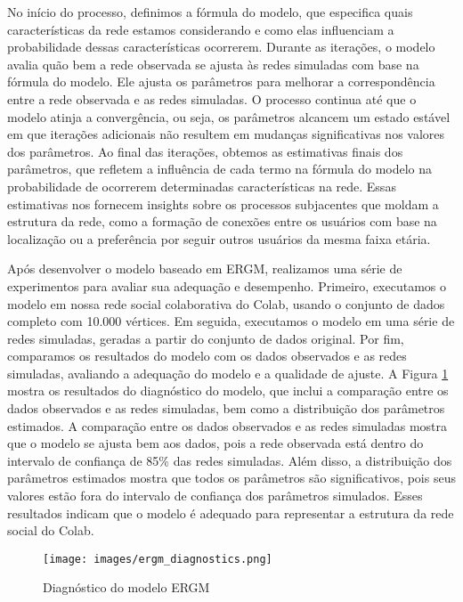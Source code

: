 No início do processo, definimos a fórmula do modelo, que especifica quais características da rede estamos considerando e como elas influenciam a probabilidade dessas características ocorrerem. Durante as iterações, o modelo avalia quão bem a rede observada se ajusta às redes simuladas com base na fórmula do modelo. Ele ajusta os parâmetros para melhorar a correspondência entre a rede observada e as redes simuladas. O processo continua até que o modelo atinja a convergência, ou seja, os parâmetros alcancem um estado estável em que iterações adicionais não resultem em mudanças significativas nos valores dos parâmetros. Ao final das iterações, obtemos as estimativas finais dos parâmetros, que refletem a influência de cada termo na fórmula do modelo na probabilidade de ocorrerem determinadas características na rede. Essas estimativas nos fornecem insights sobre os processos subjacentes que moldam a estrutura da rede, como a formação de conexões entre os usuários com base na localização ou a preferência por seguir outros usuários da mesma faixa etária.

Após desenvolver o modelo baseado em ERGM, realizamos uma série de experimentos para avaliar sua adequação e desempenho. Primeiro, executamos o modelo em nossa rede social colaborativa do Colab, usando o conjunto de dados completo com 10.000 vértices. Em seguida, executamos o modelo em uma série de redes simuladas, geradas a partir do conjunto de dados original. Por fim, comparamos os resultados do modelo com os dados observados e as redes simuladas, avaliando a adequação do modelo e a qualidade de ajuste. A Figura \ref{fig:ergm_diagnostics} mostra os resultados do diagnóstico do modelo, que inclui a comparação entre os dados observados e as redes simuladas, bem como a distribuição dos parâmetros estimados. A comparação entre os dados observados e as redes simuladas mostra que o modelo se ajusta bem aos dados, pois a rede observada está dentro do intervalo de confiança de 85\% das redes simuladas. Além disso, a distribuição dos parâmetros estimados mostra que todos os parâmetros são significativos, pois seus valores estão fora do intervalo de confiança dos parâmetros simulados. Esses resultados indicam que o modelo é adequado para representar a estrutura da rede social do Colab.


\begin{figure}[!htb]
	\caption{Diagnóstico do modelo ERGM}
	\label{fig:ergm_diagnostics}
	\centering
	\texttt{[image: images/ergm\_diagnostics.png]}
	\fautor
\end{figure}

